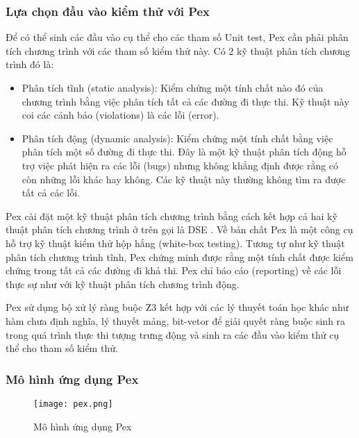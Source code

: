 \subsubsection*{Lựa chọn đầu vào kiểm thử với Pex}
Để có thể sinh các đầu vào cụ thể cho các tham số Unit test, Pex cần phải phân tích chương trình với các tham số kiểm thử này. Có 2 kỹ thuật phân tích chương trình đó là:

\begin{itemize}
	\item Phân tích tĩnh (static analysis): Kiểm chứng một tính chất nào đó của chương trình bằng việc phân tích tất cả các đường đi thực thi. Kỹ thuật này coi các cảnh bảo (violations) là các lỗi (error).
	\item Phân tích động (dynamic analysis): Kiểm chứng một tính chất bằng việc phân tích một số đường đi thực thi. Đây là một kỹ thuật phân tích động hỗ trợ việc phát hiện ra các lỗi (bugs) nhưng không khẳng định được rằng có còn những lỗi khác hay không. Các kỹ thuật này thường không tìm ra được tất cả các lỗi.
\end{itemize}

Pex cài đặt một kỹ thuật phân tích chương trình bằng cách kết hợp cả hai kỹ thuật phân tích chương trình ở trên gọi là DSE \cite{xie2009fitness, godefroid2005dart}. Về bản chất Pex là một công cụ hỗ trợ kỹ thuật kiểm thử hộp hắng (white-box testing). Tương tự như kỹ thuật phân tích chương trình tĩnh, Pex chứng minh được rằng một tính chất được kiểm chứng trong tất cả các đường đi khả thi. Pex chỉ báo cáo (reporting) về các lỗi thực sự như với kỹ thuật phân tích chương trình động.

Pex sử dụng bộ xử lý ràng buộc Z3 \cite{de2008z3} kết hợp với các lý thuyết toán học khác như hàm chưa định nghĩa, lý thuyết mảng, bit-vetor \cite{kroening2016decision} để giải quyết ràng buộc sinh ra trong quá trình thực thi tượng trưng động và sinh ra các đầu vào kiểm thử cụ thể cho tham số kiểm thử.

\subsubsection*{Mô hình ứng dụng Pex}
\begin{center}
	\begin{figure}[h]
		\begin{center}
			\texttt{[image: pex.png]}
		\end{center}
		\caption{Mô hình ứng dụng Pex}
		
	\end{figure}
\end{center}

